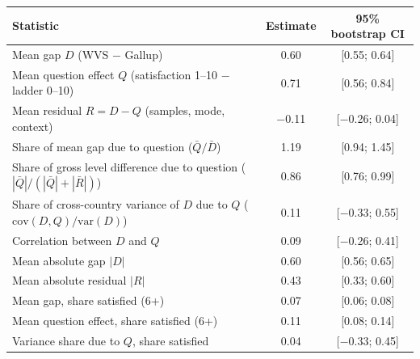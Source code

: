 \begin{tabular}{lcc}
\toprule
Statistic & Estimate & 95\% bootstrap CI \\
\midrule
Mean gap $D$ (WVS $-$ Gallup) & 0.60 & [0.55; 0.64] \\
Mean question effect $Q$ (satisfaction 1--10 $-$ ladder 0--10) & 0.71 & [0.56; 0.84] \\
Mean residual $R = D - Q$ (samples, mode, context) & \ensuremath{-}0.11 & [\ensuremath{-}0.26; 0.04] \\
\midrule
Share of mean gap due to question ($\bar Q/\bar D$) & 1.19 & [0.94; 1.45] \\
Share of gross level difference due to question ($|\bar Q|/(|\bar Q|+|\bar R|)$) & 0.86 & [0.76; 0.99] \\
\midrule
Share of cross-country variance of $D$ due to $Q$ ($\mathrm{cov}(D,Q)/\mathrm{var}(D)$) & 0.11 & [\ensuremath{-}0.33; 0.55] \\
Correlation between $D$ and $Q$ & 0.09 & [\ensuremath{-}0.26; 0.41] \\
Mean absolute gap $|D|$ & 0.60 & [0.56; 0.65] \\
Mean absolute residual $|R|$ & 0.43 & [0.33; 0.60] \\
\midrule
Mean gap, share satisfied (6+) & 0.07 & [0.06; 0.08] \\
Mean question effect, share satisfied (6+) & 0.11 & [0.08; 0.14] \\
Variance share due to $Q$, share satisfied & 0.04 & [\ensuremath{-}0.33; 0.45] \\
\bottomrule
\end{tabular}
